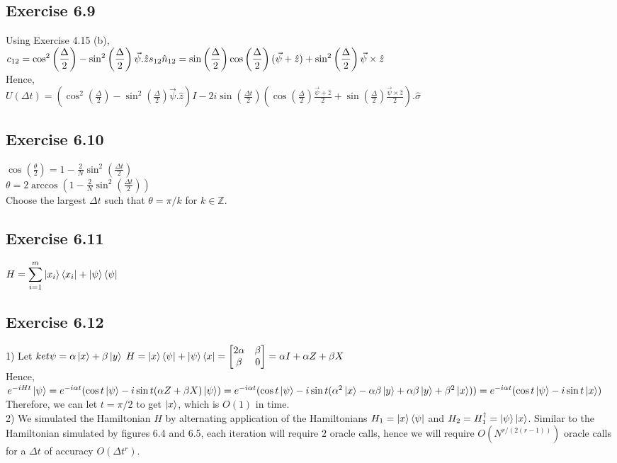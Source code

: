 \documentclass[a4paper,12pt]{article}
\begin{document}
\subsection*{Exercise 6.9}
Using Exercise 4.15 (b),\\
$\displaystyle c_{12}=\cos^2\left(\frac{\Delta}{2}\right)-\sin^2\left(\frac{\Delta}{2}\right)\vec{\psi}.\hat{z}\\
\displaystyle s_{12}\hat{n}_{12}=\sin\left(\frac{\Delta}{2}\right)\cos\left(\frac{\Delta}{2}\right)(\vec{\psi}+\hat{z})+
\sin^2\left(\frac{\Delta}{2}\right)\vec{\psi}\times\hat{z}$\\
Hence,\\
$\displaystyle U(\Delta t)=\left(\cos^2\left(\frac{\Delta}{2}\right)-\sin^2\left(\frac{\Delta}{2}\right)\vec{\psi}.\hat{z}\right)I-
2i\sin\left(\frac{\Delta t}{2}\right)\left(\cos\left(\frac{\Delta}{2}\right)\frac{\vec{\psi}+\hat{z}}{2}+
\sin\left(\frac{\Delta}{2}\right)\frac{\vec{\psi}\times\hat{z}}{2}\right).\hat{\sigma}$
\subsection*{Exercise 6.10}
$\displaystyle\cos\left(\frac{\theta}{2}\right)=1-\frac{2}{N}\sin^2\left(\frac{\Delta t}{2}\right)$\\
$\displaystyle\theta=2\arccos\left(1-\frac{2}{N}\sin^2\left(\frac{\Delta t}{2}\right)\right)$\\
Choose the largest $\Delta t$ such that $\theta=\pi/k$ for $k\in\mathbb{Z}$.
\subsection*{Exercise 6.11}
$H=\displaystyle\sum_{i=1}^m\ket{x_i}\bra{x_i}+\ket{\psi}\bra{\psi}$
\subsection*{Exercise 6.12}
1) Let $\\ket{\psi}=\alpha\ket{x}+\beta\ket{y}$ 
$H=\ket{x}\bra{\psi}+\ket{\psi}\bra{x}=\begin{bmatrix}
    2\alpha&\beta\\
    \beta&0
\end{bmatrix}=\alpha I+\alpha Z+\beta X$\\
Hence,\\
$e^{-iHt}\ket{\psi}=e^{-i\alpha t}(\cos{t}\ket{\psi}-i\sin{t}(\alpha Z+\beta X)\ket{\psi})=
e^{-i\alpha t}(\cos{t}\ket{\psi}-i\sin{t}(\alpha^2 \ket{x}-\alpha\beta\ket{y}+\alpha\beta\ket{y}+
\beta^2\ket{x}))=e^{-i\alpha t}(\cos{t}\ket{\psi}-i\sin{t}\ket{x})$\\
Therefore, we can let $t=\pi/2$ to get $\ket{x}$, which is $O(1)$ in time.\\
2) We simulated the Hamiltonian $H$ by alternating application of the Hamiltonians
$H_1=\ket{x}\bra{\psi}$ and $H_2=H_1^\dagger =\ket{\psi}\ket{x}$. Similar to the Hamiltonian simulated
by figures 6.4 and 6.5, each iteration will require $2$ oracle calls, hence we will require
$O(N^{r/(2(r-1))})$ oracle calls for a $\Delta t$ of accuracy $O(\Delta t^r)$.
\end{document}
